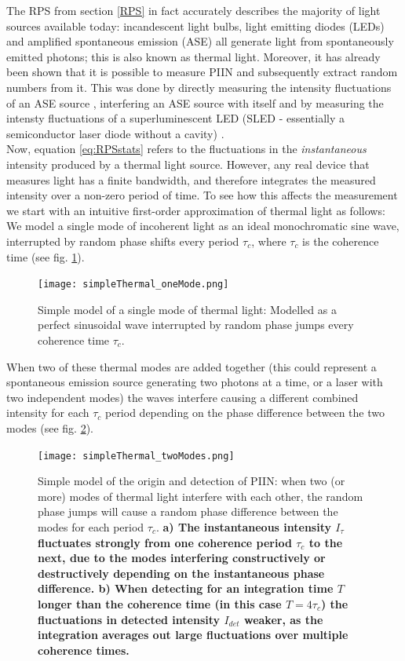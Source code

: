 \documentclass[]{article}
\begin{document}
	The RPS from section \ref{RPS} in fact accurately describes the majority of light sources available today: incandescent light bulbs, light emitting diodes (LEDs) and amplified spontaneous emission (ASE) all generate light from spontaneously emitted photons; this is also known as thermal light. Moreover, it has already been shown that it is possible to measure PIIN and subsequently extract random numbers from it. This was done by directly measuring the intensity fluctuations of an ASE source \cite{argyris_sub-tb/s_2012}, interfering an ASE source with itself \cite{li_random_2014} and by measuring the intensty fluctuations of a superluminescent LED (SLED - essentially a semiconductor laser diode without a cavity) \cite{huang_real-time_2014, li_scalable_2011}.\\
	Now, equation \ref{eq:RPSstats} refers to the fluctuations in the \textit{instantaneous} intensity produced by a thermal light source. However, any real device that measures light has a finite bandwidth, and therefore integrates the measured intensity over a non-zero period of time. To see how this affects the measurement we start with an intuitive first-order approximation of thermal light as follows: We model a single mode of incoherent light as an ideal monochromatic sine wave, interrupted by random phase shifts every period $\tau_c$, where $\tau_c$ is the coherence time (see fig. \ref{fig:simpleThermal_oneMode}).
		\begin{figure}[h]
		\centering
		\texttt{[image: simpleThermal\_oneMode.png]}
		\caption{\label{fig:simpleThermal_oneMode} Simple model of a single mode of thermal light: Modelled as a perfect sinusoidal wave interrupted by random phase jumps every coherence time $\tau_c$.}
		\end{figure}
	When two of these thermal modes are added together (this could represent a spontaneous emission source generating two photons at a time, or a laser with two independent modes) the waves interfere causing a different combined intensity for each $\tau_c$ period depending on the phase difference between the two modes (see fig. \ref{fig:simpleThermal_twoModes}).\\
		\begin{figure}[h]
		\centering
		\texttt{[image: simpleThermal\_twoModes.png]}
		\caption{\label{fig:simpleThermal_twoModes} Simple model of the origin and detection of PIIN: when two (or more) modes of thermal light interfere with each other, the random phase jumps will cause a random phase difference between the modes for each period $\tau_c$. \bf{a)} \normalfont The instantaneous intensity $I_{\tau}$ fluctuates strongly from one coherence period $\tau_c$ to the next, due to the modes interfering constructively or destructively depending on the instantaneous phase difference. \bf b) \normalfont When detecting for an integration time $T$ longer than the coherence time (in this case $T=4\tau_c$) the fluctuations in detected intensity $I_{det}$ weaker, as the integration averages out large fluctuations over multiple coherence times.}
		\end{figure}
\end{document}

